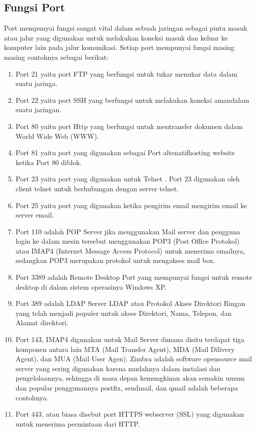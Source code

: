 \documentclass[12pt,a4paper]{article}
\begin{document}
\subsection{Fungsi Port}
\hspace{1cm}
Port mempunyai fungsi sangat vital dalam sebuah jaringan sebagai pintu masuk atau jalur yang digunakan untuk melakukan koneksi masuk dan keluar ke komputer lain pada jalur komunikasi. Setiap port mempunyai fungsi masing masing contohnya sebagai berikut:
\begin{enumerate}
\item Port 21 yaitu port FTP yang berfungsi untuk tukar menukar data dalam suatu jaringa.
\item Port 22 yaitu port SSH yang berfungsi untuk  melakukan koneksi amandalam suatu jaringan.
\item Port 80 yaitu port Http yang berfungsi untuk mentransfer dokumen dalam World Wide Web (WWW).
\item Port 81 yaitu port yang digunakan sebagai Port altenatifhosting website ketika Port 80 diblok.
\item Port 23 yaitu port yang digunakan untuk Telnet . Port 23 digunakan oleh client telnet untuk berhubungan dengan server telnet.
\item Port 25 yaitu port yang digunakan ketika pengirim email  mengirim email ke server email.
\item Port 110 adalah POP Server  jika menggunakan Mail server dan pengguna login ke dalam mesin tersebut menggunakan POP3 (Post Office Protokol) atau IMAP4 (Internet Message Access Protocol) untuk menerima emailnya, sedangkan POP3 merupakan protokol untuk mengakses mail box.
\item Port 3389 adalah Remote Desktop Port yang  mempunyai fungsi untuk remote desktop di dalam sistem operasinya Windows XP.
\item Port 389 adalah LDAP Server LDAP atau Protokol Akses Direktori Ringan yang telah
menjadi populer untuk akses Direktori, Nama, Telepon, dan Alamat direktori.
\item Port 143, IMAP4 digunakan untuk Mail Server dimana disitu terdapat tiga komponen antara lain MTA (Mail Transfer Agent), MDA (Mail Dilivery Agent), dan MUA (Mail User Agen). Zimbra adalah software opensource mail server yang sering digunakan karena mudahnya dalam instalasi dan pengelolaannya, sehingga di masa depan kemungkinan akan semakin umum dan popular penggunannya postfix, sendmail, dan qmail adalah beberapa contohnya.
\item Port 443, atau biasa disebut port HTTPS webserver (SSL) yang digunakan untuk menerima permintaan dari HTTP.

\end{enumerate}
\end{document}
